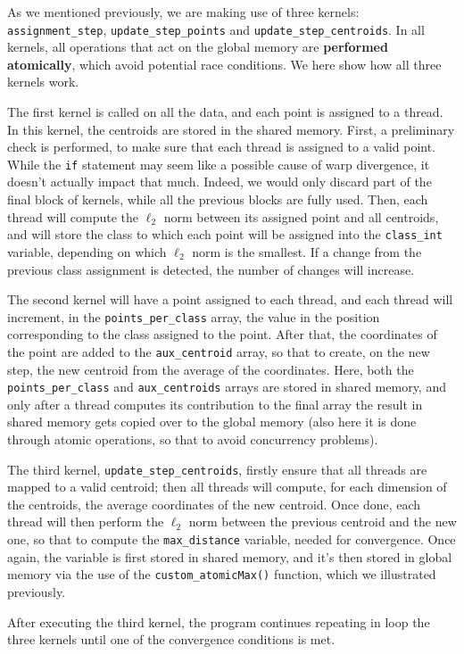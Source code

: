 \documentclass[11pt, journal]{IEEEtran}
\newcommand{\nwl}{

\vspace{11pt}

}
\begin{document}
As we mentioned previously, we are making use of three kernels: \verb|assignment_step|, \verb|update_step_points| and \verb|update_step_centroids|. In all kernels, all operations that act on the global memory are \textbf{performed atomically}, which avoid potential race conditions. We here show how all three kernels work.
\nwl
The first kernel is called on all the data, and each point is assigned to a thread. In this kernel, the centroids are stored in the shared memory. First, a preliminary check is performed, to make sure that each thread is assigned to a valid point. While the \verb|if| statement may seem like a possible cause of warp divergence, it doesn't actually impact that much. Indeed, we would only discard part of the final block of kernels, while all the previous blocks are fully used. Then, each thread will compute the $\ell_2$ norm between its assigned point and all centroids, and will store the class to which each point will be assigned into the \verb|class_int| variable, depending on which $\ell_2$ norm is the smallest. If a change from the previous class assignment is detected, the number of changes will increase.
\nwl
The second kernel will have a point assigned to each thread, and each thread will increment, in the \verb|points_per_class| array, the value in the position corresponding to the class assigned to the point. After that, the coordinates of the point are added to the \verb|aux_centroid| array, so that to create, on the new step, the new centroid from the average of the coordinates. Here, both the \verb|points_per_class| and \verb|aux_centroids| arrays are stored in shared memory, and only after a thread computes its contribution to the final array the result in shared memory gets copied over to the global memory (also here it is done through atomic operations, so that to avoid concurrency problems).
\nwl
The third kernel, \verb|update_step_centroids|, firstly ensure that all threads are mapped to a valid centroid; then all threads will compute, for each dimension of the centroids, the average coordinates of the new centroid. Once done, each thread will then perform the $\ell_2$ norm between the previous centroid and the new one, so that to compute the \verb|max_distance| variable, needed for convergence. Once again, the variable is first stored in shared memory, and it's then stored in global memory via the use of the \verb|custom_atomicMax()| function, which we illustrated previously.
\nwl
After executing the third kernel, the program continues repeating in loop the three kernels until one of the convergence conditions is met.
\end{document}
